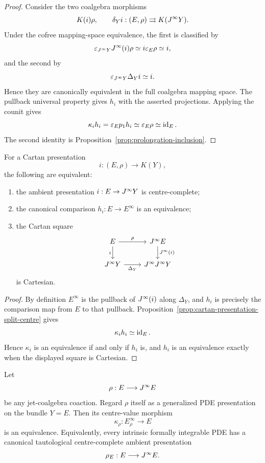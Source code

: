 \begin{proof}
Consider the two coalgebra morphisms
\[
    K(i)\rho,
    \qquad
    \delta_Yi:
    (E,\rho)\rightrightarrows K(J^{\infty} Y).
\]
Under the cofree mapping-space equivalence, the first is classified by
\[
    \varepsilon_{J^{\infty} Y}J^{\infty}(i)\rho
    \simeq
    i\varepsilon_E\rho
    \simeq i,
\]
and the second by
\[
    \varepsilon_{J^{\infty} Y}\Delta_Yi\simeq i.
\]
Hence they are canonically equivalent in the full coalgebra mapping space.  The pullback universal property gives $h_i$ with the asserted projections.  Applying the counit gives
\[
    \kappa_i h_i
    =
    \varepsilon_Ep_1h_i
    \simeq
    \varepsilon_E\rho
    \simeq
    \operatorname{id}_E.
\]
The second identity is Proposition~\ref{prop:prolongation-inclusion}.
\end{proof}

\begin{theorem}
\label{thm:cartan-centre-cartesian}
For a Cartan presentation
\[
    i:(E,\rho)\longrightarrow K(Y),
\]
the following are equivalent:
\begin{enumerate}
\item the ambient presentation $i:E\to J^{\infty} Y$ is centre-complete;
\item the canonical comparison $h_i:E\to E^\infty$ is an equivalence;
\item the Cartan square
\[
\begin{tikzcd}
E \arrow[r,"\rho"] \arrow[d,"i"']
& \Jinf E \arrow[d,"\Jinf(i)"]
\\
\Jinf Y \arrow[r,"\Delta_Y"']
& \Jinf\Jinf Y
\end{tikzcd}
\]
is Cartesian.
\end{enumerate}
\end{theorem}

\begin{proof}
By definition $E^\infty$ is the pullback of $J^{\infty}(i)$ along $\Delta_Y$, and $h_i$ is precisely the comparison map from $E$ to that pullback.  Proposition~\ref{prop:cartan-presentation-split-centre} gives
\[
    \kappa_i h_i\simeq\operatorname{id}_E.
\]
Hence $\kappa_i$ is an equivalence if and only if $h_i$ is, and $h_i$ is an equivalence exactly when the displayed square is Cartesian.
\end{proof}

\begin{theorem}
\label{thm:tautological-centre-completeness}
Let
\[
    \rho:E\longrightarrow J^{\infty} E
\]
be any jet-coalgebra coaction.  Regard $\rho$ itself as a generalized PDE presentation on the bundle $Y=E$.  Then its centre-value morphism
\[
    \kappa_\rho:E^\infty_\rho\longrightarrow E
\]
is an equivalence.  Equivalently, every intrinsic formally integrable PDE has a canonical tautological centre-complete ambient presentation
\[
    \rho_E:E\longrightarrow J^{\infty} E.
\]
\end{theorem}

